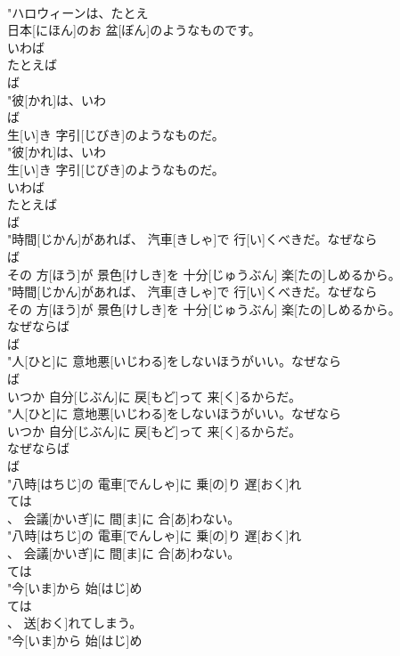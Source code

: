 \documentclass[8pt]{extreport}
\begin{document}
\begin{CJK}{UTF8}{min}
\\	"ハロウィーンは、たとえ
\\	日本[にほん]のお 盆[ぼん]のようなものです。
\\	いわば 
\\	たとえば	
\\	ば
\\	"彼[かれ]は、いわ
\\	ば
\\	生[い]き 字引[じびき]のようなものだ。
\\	"彼[かれ]は、いわ
\\	生[い]き 字引[じびき]のようなものだ。
\\	いわば 
\\	たとえば	
\\	ば
\\	"時間[じかん]があれば、 汽車[きしゃ]で 行[い]くべきだ。なぜなら
\\	ば
\\	その 方[ほう]が 景色[けしき]を 十分[じゅうぶん] 楽[たの]しめるから。
\\	"時間[じかん]があれば、 汽車[きしゃ]で 行[い]くべきだ。なぜなら
\\	その 方[ほう]が 景色[けしき]を 十分[じゅうぶん] 楽[たの]しめるから。
\\	なぜならば	
\\	ば
\\	"人[ひと]に 意地悪[いじわる]をしないほうがいい。なぜなら
\\	ば
\\	いつか 自分[じぶん]に 戻[もど]って 来[く]るからだ。
\\	"人[ひと]に 意地悪[いじわる]をしないほうがいい。なぜなら
\\	いつか 自分[じぶん]に 戻[もど]って 来[く]るからだ。
\\	なぜならば	
\\	ば
\\	"八時[はちじ]の 電車[でんしゃ]に 乗[の]り 遅[おく]れ
\\	ては
\\	、 会議[かいぎ]に 間[ま]に 合[あ]わない。
\\	"八時[はちじ]の 電車[でんしゃ]に 乗[の]り 遅[おく]れ
\\	、 会議[かいぎ]に 間[ま]に 合[あ]わない。
\\	ては
\\	"今[いま]から 始[はじ]め
\\	ては
\\	、 送[おく]れてしまう。
\\	"今[いま]から 始[はじ]め

\end{CJK}
\end{document}
